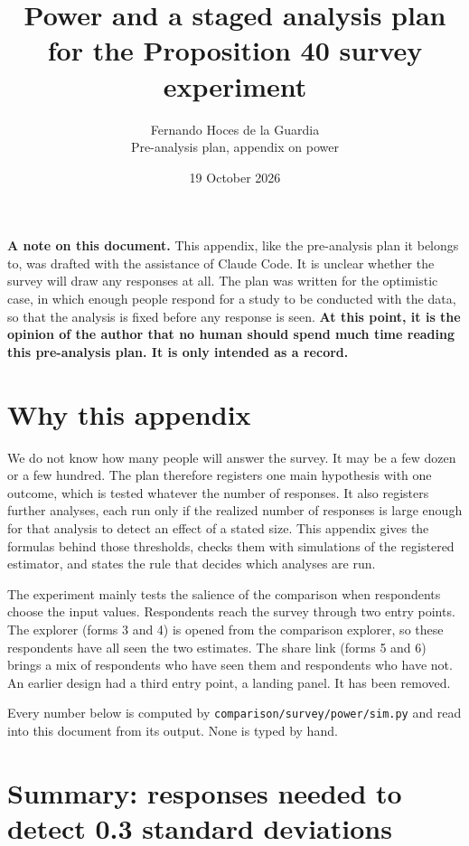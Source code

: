 \documentclass[11pt]{article}
\title{Power and a staged analysis plan for the Proposition 40 survey experiment}
\author{Fernando Hoces de la Guardia \\ \normalsize Pre-analysis plan, appendix on power}
\date{19 October 2026}
\begin{document}
\maketitle

\textbf{A note on this document.} This appendix, like the pre-analysis plan it belongs to, was
drafted with the assistance of Claude Code. It is unclear whether the survey will draw any
responses at all. The plan was written for the optimistic case, in which enough people respond for
a study to be conducted with the data, so that the analysis is fixed before any response is seen.
\textbf{At this point, it is the opinion of the author that no human should spend much time
reading this pre-analysis plan. It is only intended as a record.}

\section{Why this appendix}

We do not know how many people will answer the survey. It may be a few dozen or a few hundred.
The plan therefore registers one main hypothesis with one outcome, which is tested whatever the
number of responses. It also registers further analyses, each run only if the realized number of
responses is large enough for that analysis to detect an effect of a stated size. This appendix
gives the formulas behind those thresholds, checks them with simulations of the registered
estimator, and states the rule that decides which analyses are run.

The experiment mainly tests the salience of the comparison when respondents choose the input
values. Respondents reach the survey through two entry points. The explorer (forms 3 and 4) is
opened from the comparison explorer, so these respondents have all seen the two estimates. The
share link (forms 5 and 6) brings a mix of respondents who have seen them and respondents who have
not. An earlier design had a third entry point, a landing panel. It has been removed.

Every number below is computed by \texttt{comparison/survey/power/sim.py} and read into this
document from its output. None is typed by hand.

\section{Summary: responses needed to detect 0.3 standard deviations}\label{sec:summary}
\end{document}
